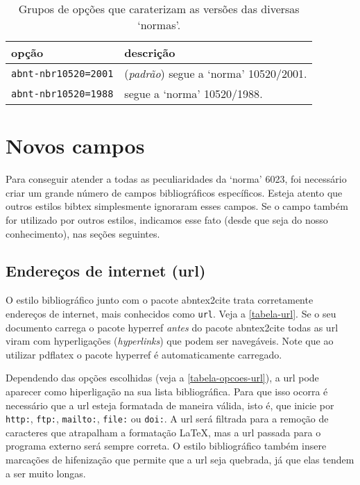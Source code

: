 \documentclass[a4paper]{ltxdoc}
\begin{document}
\begin{table}[htbp]

\caption[Versão das `normas' a ser usada]{
Grupos de opções que caraterizam as versões das diversas `normas'.}
\label{tabela-versao-normas}

\begin{center}
\begin{tabular}{lp{8cm}}\hline\hline
opção & descrição \\ \hline
{\tt abnt-nbr10520=2001} & (\emph{padrão}) segue a `norma' 10520/2001\cite{NBR10520:2001}.\\
{\tt abnt-nbr10520=1988} & segue a `norma' 10520/1988\cite{NBR10520:1988}.\\
\hline\hline
\end{tabular}
\end{center}
\end{table}


\section{Novos campos}

Para conseguir atender a todas as peculiaridades da `norma'
6023\cite{NBR6023:2000}, foi necessário criar um grande número de campos
bibliográficos específicos. Esteja atento que outros estilos \textsf{bibtex}
simplesmente ignoraram esses campos. Se o campo também for utilizado por outros
estilos, indicamos esse fato (desde que seja do nosso conhecimento), nas seções
seguintes.

\subsection{Endereços de internet (url)}\label{sec-url}

O estilo bibliográfico junto com o pacote \textsf{abntex2cite} trata
corretamente endereços de internet, mais conhecidos como {\tt url}. Veja a
\autoref{tabela-url}. Se o seu documento carrega o pacote \textsf{hyperref}
\emph{antes} do pacote \textsf{abntex2cite} todas as url viram com hyperligações
(\emph{hyperlinks}) que podem ser navegáveis. Note que ao utilizar
\textsf{pdflatex} o pacote \textsf{hyperref} é automaticamente carregado.

Dependendo das opções escolhidas (veja a \autoref{tabela-opcoes-url}),
a url pode aparecer como hiperligação na sua lista bibliográfica. Para que isso
ocorra é necessário que a url esteja formatada de maneira válida, isto é, que inicie por
{\tt http:}, {\tt ftp:}, {\tt mailto:}, {\tt file:} ou {\tt doi:}. A url será
filtrada para a remoção de caracteres que atrapalham a formatação \LaTeX, mas a
url passada para o programa externo será sempre correta. O estilo bibliográfico
também insere marcações de hifenização que permite que a url seja quebrada, já
que elas tendem a ser muito longas.
\end{document}
